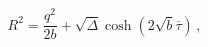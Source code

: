 \begin{equation}
R^2=\frac{q^2}{2b}+\sqrt{\Delta}\cosh\left(2\sqrt{b}\overline{\tau}\right)\,,
\label{sol-r}\end{equation}

